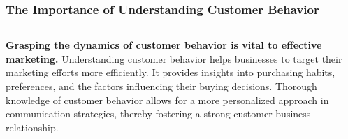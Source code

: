 \documentclass[5pt]{beamer}
\begin{document}
\begin{frame}
\frametitle{The Importance of Understanding Customer Behavior}
\begin{columns}
\begin{column}{0.7\textwidth}
\begin{block}{\textbf{Grasping the dynamics of customer behavior is vital to effective marketing.}}
Understanding customer behavior helps businesses to target their marketing efforts more efficiently. It provides insights into purchasing habits, preferences, and the factors influencing their buying decisions. Thorough knowledge of customer behavior allows for a more personalized approach in communication strategies, thereby fostering a strong customer-business relationship.
\end{block}
\end{column}
\end{columns}
\end{frame}
\end{document}
